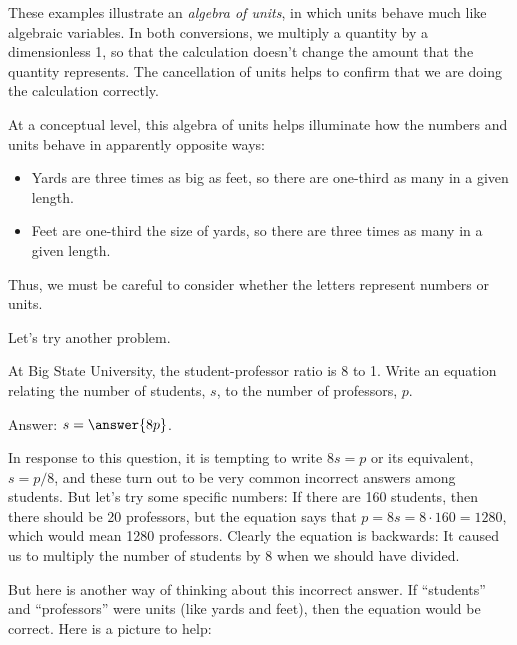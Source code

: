 \documentclass[nooutcomes]{ximera}
\begin{document}
These examples illustrate an \emph{algebra of units}, in which units behave much like algebraic variables.  In both conversions, we multiply a quantity by a dimensionless 1, so that the calculation doesn't change the amount that the quantity represents.  The cancellation of units helps to confirm that we are doing the calculation correctly.  

At a conceptual level, this algebra of units helps illuminate how the numbers and units behave in apparently opposite ways:  

\begin{itemize}
\item Yards are three times as big as feet, so there are one-third as many in a given length.  
\item Feet are one-third the size of yards, so there are three times as many in a given length.  
\end{itemize}

Thus, we must be careful to consider whether the letters represent numbers or units.  

Let's try another problem.  

\begin{question}
At Big State University, the student-professor ratio is 8 to 1.  Write an equation relating the number of students, $s$, to the number of professors, $p$.  

Answer:  $s = \answer{8p}$.  
\end{question}

In response to this question, it is tempting to write $8s = p$ or its equivalent, $s=p/8$, and these turn out to be very common incorrect answers among students.  But let's try some specific numbers:  If there are 160 students, then there should be 20 professors, but the equation says that $p = 8s = 8\cdot 160 = 1280$, which would mean 1280 professors.  Clearly the equation is backwards: It caused us to multiply the number of students by 8 when we should have divided.  

But here is another way of thinking about this incorrect answer.  If ``students'' and ``professors'' were units (like yards and feet), then the equation would be correct. Here is a picture to help:  

\begin{image}
\end{image}
\end{document}
